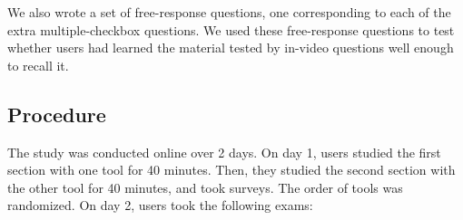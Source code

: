 \documentclass{chi-ext}
\begin{document}
We also wrote a set of free-response questions, one corresponding to each of the extra multiple-checkbox questions. We used these free-response questions to test whether users had learned the material tested by in-video questions well enough to recall it.


\subsection{Procedure}



The study was conducted online over 2 days. On day 1, users studied the first section with one tool for 40 minutes. Then, they studied the second section with the other tool for 40 minutes, and took surveys. The order of tools was randomized. On day 2, users took the following exams:

\end{document}
